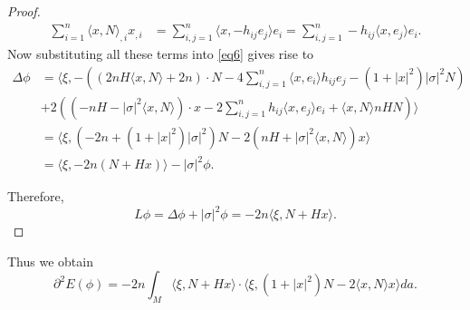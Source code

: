 \documentclass[11pt,reqno]{amsart}
\theoremstyle{definition}
\begin{document}
\begin{proof}
\begin{align*}
\sum_{i=1}^n {\langle} x,N{\rangle}_{,i}x_{,i}&=\sum_{i,j=1}^n{\langle} x,-h_{ij}e_j{\rangle} e_i=\sum_{i,j=1}^n-h_{ij}{\langle} x,e_j{\rangle} e_i.
\end{align*}
Now substituting all these terms into \eqref{eq6} gives rise to
\begin{align*}
\Delta \phi&={\langle} \xi,-((2nH{\langle} x,N{\rangle}+2n) \cdot N-4\sum_{i,j=1}^n{\langle} x,e_i{\rangle} h_{ij}e_j-(1+|x|^2)|\sigma|^2N) \\
           &+2((-nH-|\sigma|^2{\langle} x,N{\rangle}) \cdot x-2\sum_{i,j=1}^n h_{ij}{\langle} x,e_j{\rangle} e_i+{\langle} x,N{\rangle} nHN){\rangle}\\
           &={\langle} \xi,(-2n+(1+|x|^2)|\sigma|^2)N-2(nH+|\sigma|^2{\langle} x,N{\rangle})x{\rangle}\\
           &={\langle} \xi, -2n(N+Hx){\rangle}-|\sigma|^2\phi.
\end{align*}

Therefore,
\begin{equation*}
L\phi=\Delta \phi+|\sigma|^2\phi=-2n\langle \xi,N+Hx\rangle.
\end{equation*}

\end{proof}

Thus we obtain
\begin{equation*}
{\partial}^2 E(\phi)=-2n\int_M \langle \xi,N+Hx\rangle\cdot \langle \xi, (1+|x|^2)N-2\langle x,N\rangle x\rangle da.
\end{equation*}
\end{document}
